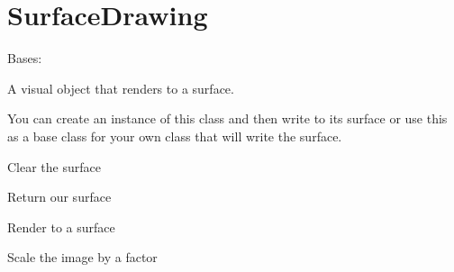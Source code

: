 \documentclass[letterpaper,10pt,english]{sphinxmanual}
\begin{document}
\section{SurfaceDrawing}
\label{visual:surfacedrawing}

\begin{fulllineitems}
\label{visual:serge.visual.SurfaceDrawing}
Bases: {\hyperref[visual:serge.visual.Drawing]{}}

A visual object that renders to a surface.

You can create an instance of this class and then write to its surface
or use this as a base class for your own class that will write
the surface.

\begin{fulllineitems}
\label{visual:serge.visual.SurfaceDrawing.clearSurface}
Clear the surface

\end{fulllineitems}


\begin{fulllineitems}
\label{visual:serge.visual.SurfaceDrawing.getSurface}
Return our surface

\end{fulllineitems}


\begin{fulllineitems}
\label{visual:serge.visual.SurfaceDrawing.renderTo}
Render to a surface

\end{fulllineitems}


\begin{fulllineitems}
\label{visual:serge.visual.SurfaceDrawing.scaleBy}
Scale the image by a factor


\end{fulllineitems}
\end{fulllineitems}
\end{document}
